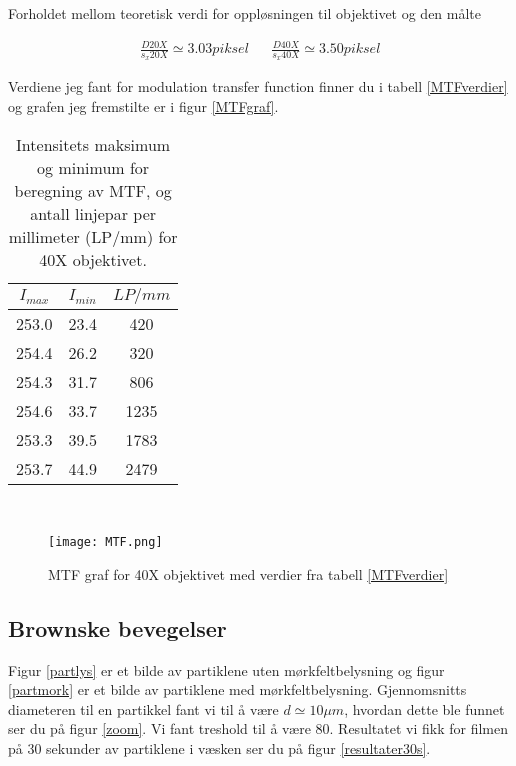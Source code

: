 \documentclass[norsk,a4paper,12pt]{article}
\begin{document}
\begin{table}
\caption{Forholdet mellom teoretisk verdi for oppløsningen til objektivet og den målte}
	\begin{align*}
	\frac{D20X}{s_x20X} \simeq 3.03 piksel && \frac{D40X}{s_x40X} \simeq 3.50 piksel
	\end{align*}
\label{forholdtm}
\end{table}

Verdiene jeg fant for modulation transfer function finner du i tabell \vref{MTFverdier} og grafen jeg fremstilte er i figur \vref{MTFgraf}.

\begin{table}[h!]
\centering
\caption[MTF-verdier]{Intensitets maksimum og minimum for beregning av MTF, og antall linjepar per millimeter (LP/mm) for 40X objektivet. }
	\begin{tabular}{| c | c | c |}
	\hline
	$I_{max}$ & $I_{min}$ & $LP/mm$ \\ 
	\hline
	253.0 & 23.4 & 420\\
	254.4 & 26.2 & 320\\
	254.3 & 31.7 & 806\\
	254.6 & 33.7 & 1235\\
	253.3 & 39.5 & 1783\\
	253.7 & 44.9 & 2479\\
	\hline
	\end{tabular}\\
\label{MTFverdier}
\end{table}

\begin{figure}
	\begin{center}
  	\texttt{[image: MTF.png]}\\
	\caption[MTF graf for 40X objektivet]{MTF graf for 40X objektivet med verdier fra tabell \vref{MTFverdier}}
	\label{MTFgraf}
	\end{center}
\end{figure}

\subsection{Brownske bevegelser}

Figur \vref{partlys} er et bilde av partiklene uten mørkfeltbelysning og figur \vref{partmork} er et bilde av partiklene med mørkfeltbelysning. Gjennomsnitts diameteren til en partikkel fant vi til å være $d \simeq 10\mu m$, hvordan dette ble funnet ser du på figur \vref{zoom}. Vi fant treshold til å være 80. Resultatet vi fikk for filmen på 30 sekunder av partiklene i væsken ser du på figur \vref{resultater30s}.
\end{document}
